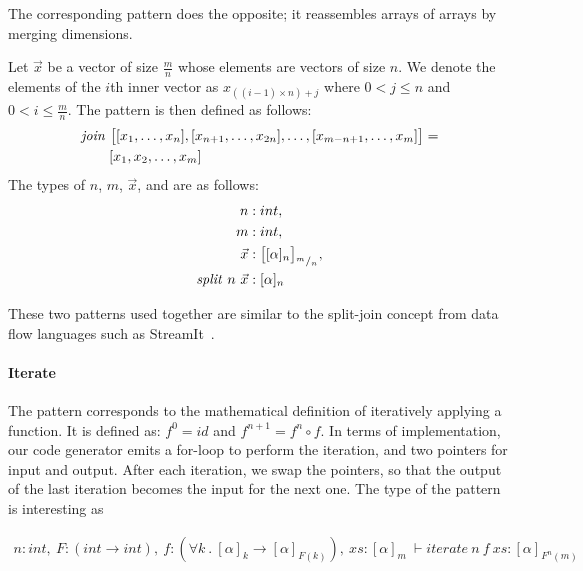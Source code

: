 \noindent
The corresponding  pattern does the opposite; it reassembles arrays of arrays by merging dimensions.
\begin{definition}
  \label{definition:pattern:join}
  Let $\vec{x}$ be a vector of size $\frac{m}{n}$ whose elements are vectors of size $n$.
  We denote the elements of the $i$th inner vector as $x_{((i-1)\times n) + j}$ where $0 < j \leq n$ and $0 < i \leq \frac{m}{n}$.
  The \join pattern is then defined as follows:
  \begin{align*}
    &\text{\textit{join}}\ \big[[x_1, \ldots, x_n], [x_{n+1}, \ldots, x_{2n}], \ldots, [x_{m-n+1}, \ldots, x_m]\big] =\\
    &\qquad[x_1, x_2, \dots, x_m]
  \end{align*}
  The types of $n$, $m$, $\vec{x}$, and \join are as follows:
  \begin{align*}
    n &: int,\\
    m &: int,\\
    \vec{x} &: \big[[\alpha]_n\big]_{{}^m/_n},\\
    \text{\textit{split}}\ n\ \vec{x} &: [\alpha]_n
  \end{align*}
\end{definition}


These two patterns used together are similar to the split-join concept from data flow languages such as StreamIt~\cite{thies02streamit}.


\paragraph{Iterate}
The  pattern corresponds to the mathematical definition of iteratively applying a function.
It is defined as: {$f^0 = id$} and {$f^{n+1} = f^n \circ f$}.
In terms of implementation, our code generator emits a for-loop to perform the iteration, and two pointers for input and output.
After each iteration, we swap the pointers, so that the output of the last iteration becomes the input for the next one.
The type of the  pattern is interesting as 

\begin{align}
  n : int,\ F : (int \rightarrow int),\ f : (\forall k\ .\ [\alpha]_k \rightarrow [\alpha]_{F(k)}),\ xs : [\alpha]_m\ %
  \vdash iterate\ n\ f\ xs : [\alpha]_{F^{n}(m)}
\end{align}

